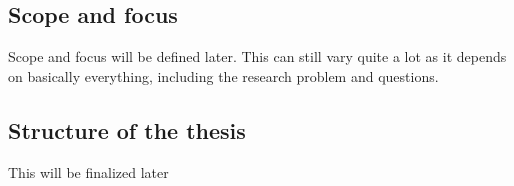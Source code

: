 \documentclass[english, 12pt, a4paper, sci, utf8, a-1b, online]{aaltothesis}
\begin{document}




\subsection{Scope and focus}
{
  \color{gray} Scope and focus will be defined later. This can still vary quite a lot as it depends on basically everything, including the research problem and questions.
}

\subsection{Structure of the thesis}
{
  \color{gray} This will be finalized later
}
\end{document}
